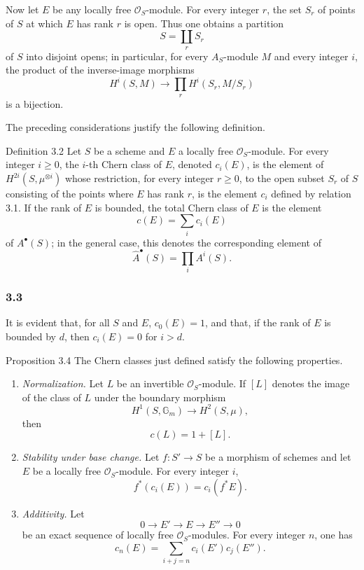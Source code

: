 Now let $E$ be any locally free $\mathcal O_S$-module. For every integer $r$, the set $S_r$ of points of $S$ at which $E$ has rank $r$ is open. Thus one obtains a partition
\[
S=\coprod_r S_r
\]
of $S$ into disjoint opens; in particular, for every $A_S$-module $M$ and every integer $i$, the product of the inverse-image morphisms
\[
H^i(S,M)\longrightarrow \prod_r H^i(S_r,M/S_r)
\]
is a bijection.

The preceding considerations justify the following definition.

\begin{statement}{Definition 3.2}
Let $S$ be a scheme and $E$ a locally free $\mathcal O_S$-module. For every integer $i\ge0$, the $i$-th Chern class of $E$, denoted $c_i(E)$, is the element of $H^{2i}(S,\mu^{\otimes i})$ whose restriction, for every integer $r\ge0$, to the open subset $S_r$ of $S$ consisting of the points where $E$ has rank $r$, is the element $c_i$ defined by relation 3.1. If the rank of $E$ is bounded, the total Chern class of $E$ is the element
\[
c(E)=\sum_i c_i(E)
\]
of $A^\bullet(S)$; in the general case, this denotes the corresponding element of
\[
\widehat A^{\bullet}(S)=\prod_i A^i(S).
\]
\end{statement}

\subsubsection*{3.3}
It is evident that, for all $S$ and $E$, $c_0(E)=1$, and that, if the rank of $E$ is bounded by $d$, then $c_i(E)=0$ for $i>d$.

\begin{statement}{Proposition 3.4}
The Chern classes just defined satisfy the following properties.
\begin{enumerate}[label=(\roman*)]
\item \emph{Normalization.} Let $L$ be an invertible $\mathcal O_S$-module. If $[L]$ denotes the image of the class of $L$ under the boundary morphism
\[
H^1(S,\mathbb G_m)\longrightarrow H^2(S,\mu),
\]
then
\[
c(L)=1+[L].
\]
\item \emph{Stability under base change.} Let $f:S'\to S$ be a morphism of schemes and let $E$ be a locally free $\mathcal O_S$-module. For every integer $i$,
\[
f^*(c_i(E))=c_i(f^*E).
\]
\item \emph{Additivity.} Let
\[
0\to E'\to E\to E''\to0
\]
be an exact sequence of locally free $\mathcal O_S$-modules. For every integer $n$, one has
\[
c_n(E)=\sum_{i+j=n}c_i(E')c_j(E'').
\]
\end{enumerate}
\end{statement}

